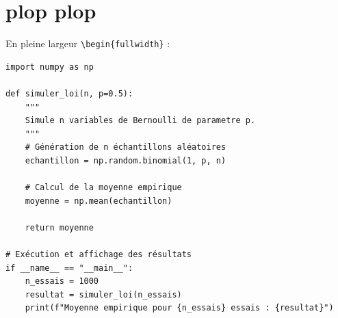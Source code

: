 %
%
%
%
%

\section{plop plop}

En pleine largeur \verb|\begin{fullwidth}| :

\begin{fullwidth}
	\begin{lstlisting}[caption={Simulation d'une variable aléatoire et calcul de la moyenne empirique}]
import numpy as np

def simuler_loi(n, p=0.5):
	"""
	Simule n variables de Bernoulli de parametre p.
	"""
	# Génération de n échantillons aléatoires
	echantillon = np.random.binomial(1, p, n)

	# Calcul de la moyenne empirique
	moyenne = np.mean(echantillon)

	return moyenne

# Exécution et affichage des résultats
if __name__ == "__main__":
	n_essais = 1000
	resultat = simuler_loi(n_essais)
	print(f"Moyenne empirique pour {n_essais} essais : {resultat}")
			\end{lstlisting}
\end{fullwidth}


